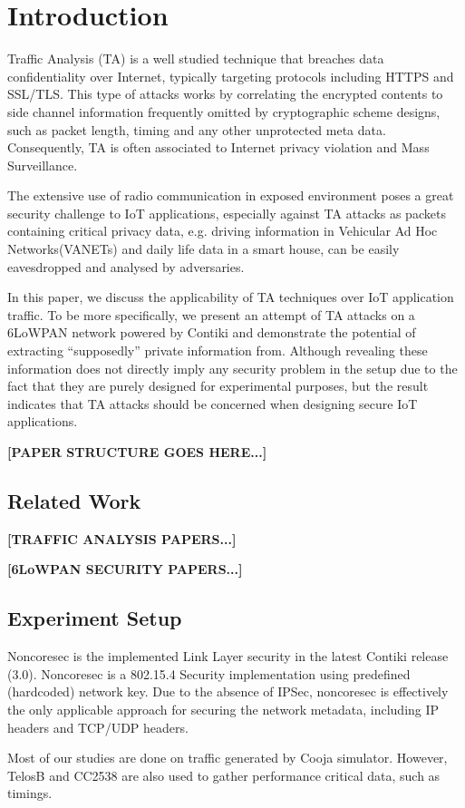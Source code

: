\section{Introduction}
Traffic Analysis (TA) is a well studied technique that breaches data confidentiality over Internet, typically targeting protocols including HTTPS\cite{rfc2818} and SSL\cite{rfc6101}/TLS\cite{rfc5246}. This type of attacks works by correlating the encrypted contents to side channel information frequently omitted by cryptographic scheme designs, such as packet length, timing and any other unprotected meta data. Consequently, TA is often associated to Internet privacy violation and Mass Surveillance.

The extensive use of radio communication in exposed environment poses a great security challenge to IoT applications, especially against TA attacks as packets containing critical privacy data, e.g. driving information in Vehicular Ad Hoc Networks(VANETs)\cite{VANET} and daily life data in a smart house, can be easily eavesdropped and analysed by adversaries.

In this paper, we discuss the applicability of TA techniques over IoT application traffic. To be more specifically, we present an attempt of TA attacks on a 6LoWPAN\cite{rfc4944} network powered by Contiki\cite{Contiki} and demonstrate the potential of extracting ``supposedly'' private information from. Although revealing these information does not directly imply any security problem in the setup due to the fact that they are purely designed for experimental purposes, but the result indicates that TA attacks should be concerned when designing secure IoT applications.

\textbf{[PAPER STRUCTURE GOES HERE...]}

\subsection{Related Work}
\textbf{[TRAFFIC ANALYSIS PAPERS...]}

\textbf{[6LoWPAN SECURITY PAPERS...]}

\subsection{Experiment Setup}
Noncoresec\cite{noncoresec} is the implemented Link Layer\cite{OSI} security in the latest Contiki release (3.0). Noncoresec is a 802.15.4 Security\cite{802154} implementation using predefined (hardcoded) network key. Due to the absence of IPSec\cite{rfc4301}, noncoresec is effectively the only applicable approach for securing the network metadata, including IP headers and TCP/UDP headers.

Most of our studies are done on traffic generated by Cooja simulator\cite{Contiki}. However, TelosB\cite{TelosB} and CC2538\cite{CC2538} are also used to gather performance critical data, such as timings.